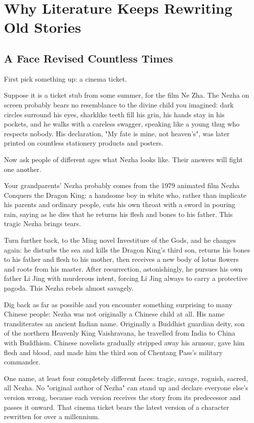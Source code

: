 \chapter[Why Literature Retells Old Stories]{Why Literature Keeps Rewriting Old Stories}
\section{A Face Revised Countless Times}
First pick something up: a cinema ticket.

Suppose it is a ticket stub from some summer, for the film Ne Zha. The Nezha on screen probably bears no resemblance to the divine child you imagined: dark circles surround his eyes, sharklike teeth fill his grin, his hands stay in his pockets, and he walks with a careless swagger, speaking like a young thug who respects nobody. His declaration, "My fate is mine, not heaven's", was later printed on countless stationery products and posters.

Now ask people of different ages what Nezha looks like. Their answers will fight one another.

Your grandparents' Nezha probably comes from the 1979 animated film Nezha Conquers the Dragon King: a handsome boy in white who, rather than implicate his parents and ordinary people, cuts his own throat with a sword in pouring rain, saying as he dies that he returns his flesh and bones to his father. This tragic Nezha brings tears.

Turn further back, to the Ming novel Investiture of the Gods, and he changes again: he disturbs the sea and kills the Dragon King's third son, returns his bones to his father and flesh to his mother, then receives a new body of lotus flowers and roots from his master. After resurrection, astonishingly, he pursues his own father Li Jing with murderous intent, forcing Li Jing always to carry a protective pagoda. This Nezha rebels almost savagely.

Dig back as far as possible and you encounter something surprising to many Chinese people: Nezha was not originally a Chinese child at all. His name transliterates an ancient Indian name. Originally a Buddhist guardian deity, son of the northern Heavenly King Vaishravana, he travelled from India to China with Buddhism. Chinese novelists gradually stripped away his armour, gave him flesh and blood, and made him the third son of Chentang Pass's military commander.

One name, at least four completely different faces: tragic, savage, roguish, sacred, all Nezha. No "original author of Nezha" can stand up and declare everyone else's version wrong, because each version receives the story from its predecessor and passes it onward. That cinema ticket bears the latest version of a character rewritten for over a millennium.

